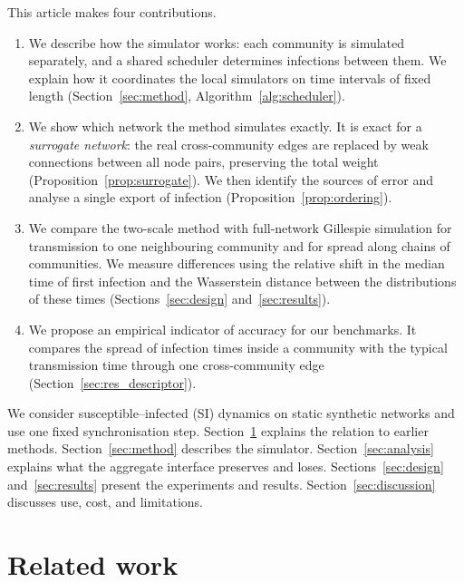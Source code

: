 \documentclass[a4paper,fleqn]{cas-sc}
\begin{document}
This article makes four contributions.
\begin{enumerate}
\item We describe how the simulator works: each community is simulated separately, and a shared scheduler determines infections between them. We explain how it coordinates the local simulators on time intervals of fixed length (Section~\ref{sec:method}, Algorithm~\ref{alg:scheduler}).
\item We show which network the method simulates exactly. It is exact for a \emph{surrogate network}: the real cross-community edges are replaced by weak connections between all node pairs, preserving the total weight (Proposition~\ref*{prop:surrogate}). We then identify the sources of error and analyse a single export of infection (Proposition~\ref*{prop:ordering}).
\item We compare the two-scale method with full-network Gillespie simulation for transmission to one neighbouring community and for spread along chains of communities. We measure differences using the relative shift in the median time of first infection and the Wasserstein distance between the distributions of these times (Sections~\ref*{sec:design} and~\ref*{sec:results}).
\item We propose an empirical indicator of accuracy for our benchmarks. It compares the spread of infection times inside a community with the typical transmission time through one cross-community edge (Section~\ref*{sec:res_descriptor}).
\end{enumerate}

We consider susceptible--infected (SI) dynamics on static synthetic networks and use one fixed synchronisation step. Section~\ref{sec:related} explains the relation to earlier methods. Section~\ref{sec:method} describes the simulator. Section~\ref*{sec:analysis} explains what the aggregate interface preserves and loses. Sections~\ref*{sec:design} and~\ref*{sec:results} present the experiments and results. Section~\ref*{sec:discussion} discusses use, cost, and limitations.

\clearpage

\section{Related work}
\label{sec:related}
\end{document}
